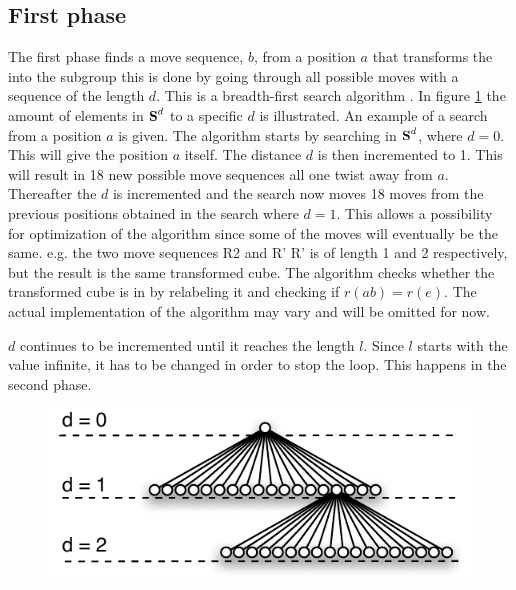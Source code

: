 \subsection{First phase}
\label{sub:firstPhase}
The first phase finds a move sequence, $b$, from a position $a$ that transforms the \rubik{} into the subgroup  this is done by going through all possible moves with a sequence of the length $d$. This is a breadth-first search algorithm \cite[pp. 729-731]{Rosen07}.
In figure \ref{fig:searchExpansion} the amount of elements in $\textbf{S}^d$ to a specific $d$ is illustrated.
An example of a search from a position $a$ is given. The algorithm starts by searching in $\textbf{S}^{d}$, where $d =  0$. This will give the position $a$ itself. The distance $d$ is then incremented to 1. This will result in 18 new possible move sequences all one twist away from $a$. Thereafter the $d$ is incremented and the search now moves 18 moves from the previous positions obtained in the search where $d = 1$. This allows a possibility for optimization of the algorithm since some of the moves will eventually be the same. e.g. the two move sequences R2 and R' R' is of length 1 and 2 respectively, but the result is the same transformed cube. The algorithm checks whether the transformed cube is in  by relabeling it and checking if $r(ab) = r(e)$. The actual implementation of the algorithm may vary and will be omitted for now.

$d$ continues to be incremented until it reaches the length $l$. Since $l$ starts with the value infinite, it has to be changed in order to stop the loop. This happens in the second phase.

\begin{figure}[!hbt]
	\centering
		\includegraphics[scale=0.75]{input/pics/searchExpansion.pdf}
	\caption{}
	\label{fig:searchExpansion}
\end{figure}


